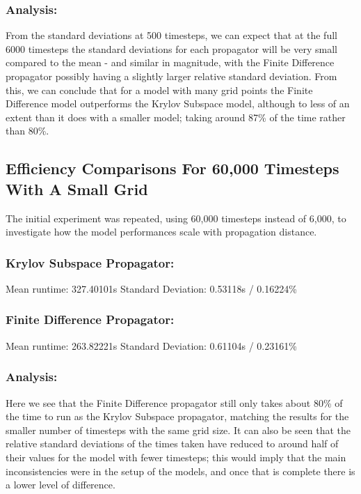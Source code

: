 \subsubsection{Analysis:}
From the standard deviations at 500 timesteps, we can expect that at the full 6000 timesteps the standard deviations for each propagator will be very small compared to the mean - and similar in magnitude, with the Finite Difference propagator possibly having a slightly larger relative standard deviation. From this, we can conclude that for a model with many grid points the Finite Difference model outperforms the Krylov Subspace model, although to less of an extent than it does with a smaller model; taking around 87\% of the time rather than 80\%.

\subsection{Efficiency Comparisons For 60,000 Timesteps With A Small Grid}
The initial experiment was repeated, using 60,000 timesteps instead of 6,000, to investigate how the model performances scale with propagation distance. 

\subsubsection{Krylov Subspace Propagator:}

Mean runtime: \hspace{2cm} 327.40101s\newline
Standard Deviation: 0.53118s / 0.16224\%

\subsubsection{Finite Difference Propagator:}

Mean runtime: \hspace{2cm} 263.82221s\newline
Standard Deviation: 0.61104s / 0.23161\%

\subsubsection{Analysis:}
Here we see that the Finite Difference propagator still only takes about 80\% of the time to run as the Krylov Subspace propagator, matching the results for the smaller number of timesteps with the same grid size. It can also be seen that the relative standard deviations of the times taken have reduced to around half of their values for the model with fewer timesteps; this would imply that the main inconsistencies were in the setup of the models, and once that is complete there is a lower level of difference.

